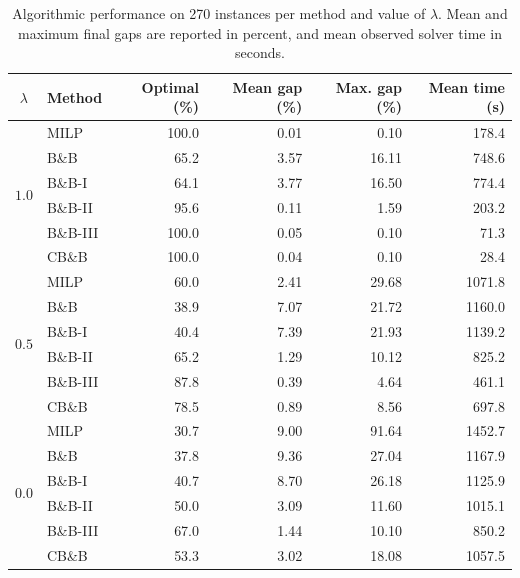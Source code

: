 \documentclass{itor}
\begin{document}
\begin{table}[htbp]
    \centering
    \caption{Algorithmic performance on 270 instances per method and value of $\lambda$. Mean and maximum final gaps are reported in percent, and mean observed solver time in seconds.}
    \label{tab:new20-gaps-times}
\begin{tabular}{@{}clrrrr@{}}
\toprule
$\lambda$ & Method & Optimal (\%) & Mean gap (\%) & Max. gap (\%) & Mean time (s) \\
\midrule
\multirow{6}{*}{$1.0$}
 & MILP      & 100.0 & 0.01 & 0.10 & 178.4 \\
 & B\&B      & 65.2  & 3.57 & 16.11 & 748.6 \\
 & B\&B-I    & 64.1  & 3.77 & 16.50 & 774.4 \\
 & B\&B-II   & 95.6  & 0.11 & 1.59 & 203.2 \\
 & B\&B-III  & 100.0 & 0.05 & 0.10 & 71.3 \\
 & CB\&B     & 100.0 & 0.04 & 0.10 & 28.4 \\
\midrule
\multirow{6}{*}{$0.5$}
 & MILP      & 60.0 & 2.41 & 29.68 & 1071.8 \\
 & B\&B      & 38.9 & 7.07 & 21.72 & 1160.0 \\
 & B\&B-I    & 40.4 & 7.39 & 21.93 & 1139.2 \\
 & B\&B-II   & 65.2 & 1.29 & 10.12 & 825.2 \\
 & B\&B-III  & 87.8 & 0.39 & 4.64 & 461.1 \\
 & CB\&B     & 78.5 & 0.89 & 8.56 & 697.8 \\
\midrule
\multirow{6}{*}{$0.0$}
 & MILP      & 30.7 & 9.00 & 91.64 & 1452.7 \\
 & B\&B      & 37.8 & 9.36 & 27.04 & 1167.9 \\
 & B\&B-I    & 40.7 & 8.70 & 26.18 & 1125.9 \\
 & B\&B-II   & 50.0 & 3.09 & 11.60 & 1015.1 \\
 & B\&B-III  & 67.0 & 1.44 & 10.10 & 850.2 \\
 & CB\&B     & 53.3 & 3.02 & 18.08 & 1057.5 \\
\bottomrule
\end{tabular}
\end{table}
\end{document}
